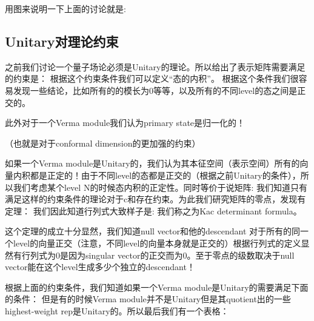 用图来说明一下上面的讨论就是:


\subsection{Unitary对理论约束}
之前我们讨论一个量子场论必须是Unitary的理论。所以给出了表示矩阵需要满足的约束是：
根据这个约束条件我们可以定义“态的内积”。
根据这个条件我们很容易发现一些结论，比如所有的\seq{\kit{\chi}}的模长为0等等，以及所有的不同level的态之间是正交的。

此外对于一个Verma module我们认为primary state是归一化的！

（也就是对于conformal dimension的更加强的约束）

如果一个Verma module是Unitary的，我们认为其本征空间（表示空间）所有的向量内积都是正定的！由于不同level的态都是正交的（根据之前Unitary的条件），所以我们考虑某个level N的时候态内积的正定性。同时等价于说矩阵:
我们知道只有满足这样的约束条件的理论对于c和\seq{\Delta}存在约束。为此我们研究矩阵的零点，发现有定理：
我们因此知道行列式大致样子是:
我们称之为Kac determinant formula。

这个定理的成立十分显然，我们知道null vector和他的descendant 对于所有的同一个level的向量正交（注意，不同level的向量本身就是正交的）根据行列式的定义显然有行列式为0是因为singular vector的正交而为0。至于零点的级数取决于null 
vector能在这个level生成多少个独立的descendant！

根据上面的约束条件，我们知道如果一个Verma module是Unitary的需要满足下面的条件：
但是有的时候Verma module并不是Unitary但是其quotient出的一些highest-weight rep是Unitary的。所以最后我们有一个表格：

